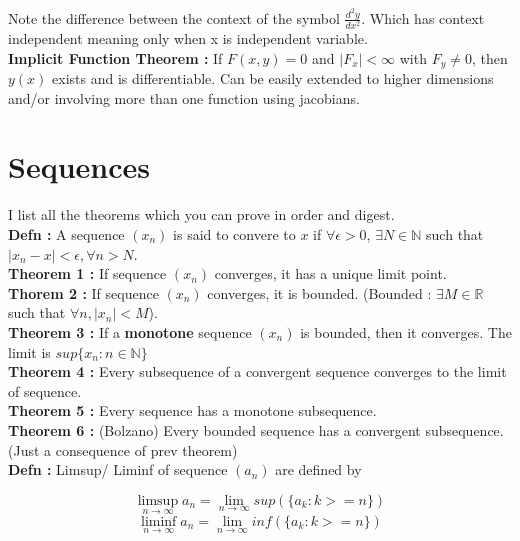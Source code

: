 \documentclass{report}
\begin{document}
\noindent Note the difference between the context of the symbol $\frac{d^2 y}{dx^2}$. Which has context independent meaning only when x is independent variable.\\

\noindent\textbf{Implicit Function Theorem :} If $F(x,y)=0$ and $|F_x| < \infty$ with $F_y\neq 0$, then $y(x)$ exists and is differentiable. Can be easily extended to higher dimensions and/or involving more than one function using jacobians.

\chapter{Sequences}
I list all the theorems which you can prove in order and digest.\\

\noindent\textbf{Defn :} A sequence $(x_n)$ is said to convere to $x$ if $\forall \epsilon > 0$, $\exists N\in \mathbb{N}$ such that $|x_n - x| < \epsilon, \forall n > N.$ \\

\noindent \textbf{Theorem 1 :} If sequence $(x_n)$ converges, it has a unique limit point.\\

\noindent \textbf{Thorem 2 :} If sequence $(x_n)$ converges, it is bounded. (Bounded : $\exists M \in \mathbb{R}$ such that $\forall n,  |x_n| < M$).\\

\noindent \textbf{Theorem 3 :} If a \textbf{monotone} sequence $(x_n)$ is bounded, then it converges. The limit is $sup\{x_n : n \in \mathbb{N}\}$ \\

\noindent \textbf{Theorem 4 :} Every subsequence of a convergent sequence converges to the limit of sequence.\\

\noindent \textbf{Theorem 5 :} Every sequence has a monotone subsequence.\\

\noindent \textbf{Theorem 6 :} (Bolzano) Every bounded sequence has a convergent subsequence. (Just a consequence of prev theorem)\\

\noindent \textbf{Defn :} Limsup/ Liminf of sequence $(a_n)$ are defined by 

$$\limsup_{n\to\infty} a_n = \lim_{n\to\infty}sup(\{a_k : k>=n\})$$ 
$$\liminf_{n\to\infty} a_n = \lim_{n\to\infty}inf(\{a_k : k>=n\})$$ \\
\end{document}
